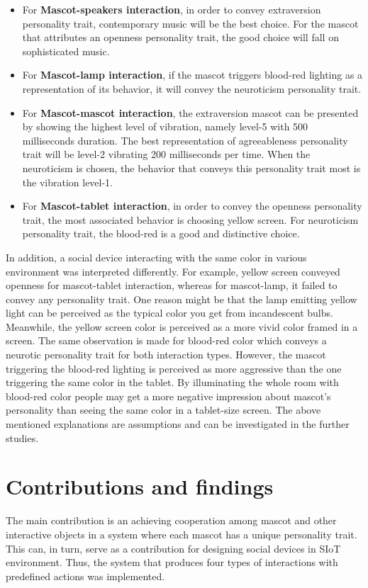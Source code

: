 \begin{itemize}
    \item For \textbf{Mascot-speakers interaction}, in order to convey extraversion personality trait,
    contemporary music will be the best choice.
    For the mascot that attributes an openness personality trait,
    the good choice will fall on sophisticated music.
    \item For \textbf{Mascot-lamp interaction}, if the mascot triggers blood-red lighting as a
    representation of its behavior, it will convey the neuroticism personality trait.
    \item For \textbf{Mascot-mascot interaction}, the extraversion mascot can be presented by
    showing the highest level of vibration, namely level-5 with 500 milliseconds duration.
    The best representation of agreeableness personality trait will be level-2 vibrating 200 milliseconds per time.
    When the neuroticism is chosen, the behavior that conveys this personality trait most is the vibration level-1.
    \item For \textbf{Mascot-tablet interaction}, in order to convey the openness personality trait,
    the most associated behavior is choosing yellow screen.
    For neuroticism personality trait, the blood-red is a good and distinctive choice.
\end{itemize}

In addition, a social device interacting with the same color in various environment was interpreted differently.
For example, yellow screen conveyed openness for mascot-tablet interaction, whereas for mascot-lamp,
it failed to convey any personality trait.
One reason might be that the lamp emitting yellow light can be perceived
as the typical color you get from incandescent bulbs.
Meanwhile, the yellow screen color is perceived as a more vivid color framed in a screen.
The same observation is made for blood-red color which conveys a neurotic personality trait for both interaction types.
However, the mascot triggering the blood-red lighting is perceived as
more aggressive than the one triggering the same color in the tablet.
By illuminating the whole room with blood-red color people may
get a more negative impression about mascot’s personality than seeing the same color in a tablet-size screen.
The above mentioned explanations are assumptions and can be investigated in the further studies.

\section{Contributions and findings}
\label{sec:contributions-and-findings}
The main contribution is an achieving cooperation among mascot and other interactive
objects in a system where each mascot has a unique personality trait.
This can, in turn, serve as a contribution for designing social devices in SIoT environment.
Thus, the system that produces four types of interactions with predefined actions was implemented.

